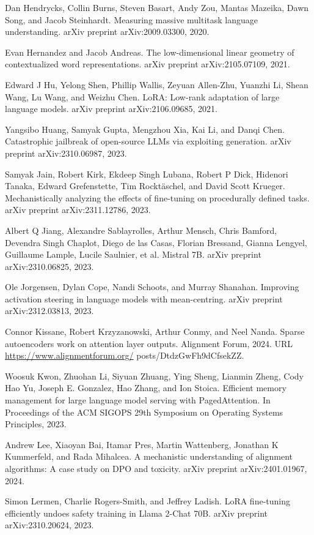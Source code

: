 \documentclass[10pt]{article}
\begin{document}
Dan Hendrycks, Collin Burns, Steven Basart, Andy Zou, Mantas Mazeika, Dawn Song, and Jacob Steinhardt. Measuring massive multitask language understanding. arXiv preprint arXiv:2009.03300, 2020.

Evan Hernandez and Jacob Andreas. The low-dimensional linear geometry of contextualized word representations. arXiv preprint arXiv:2105.07109, 2021.

Edward J Hu, Yelong Shen, Phillip Wallis, Zeyuan Allen-Zhu, Yuanzhi Li, Shean Wang, Lu Wang, and Weizhu Chen. LoRA: Low-rank adaptation of large language models. arXiv preprint arXiv:2106.09685, 2021.

Yangsibo Huang, Samyak Gupta, Mengzhou Xia, Kai Li, and Danqi Chen. Catastrophic jailbreak of open-source LLMs via exploiting generation. arXiv preprint arXiv:2310.06987, 2023.

Samyak Jain, Robert Kirk, Ekdeep Singh Lubana, Robert P Dick, Hidenori Tanaka, Edward Grefenstette, Tim Rocktäschel, and David Scott Krueger. Mechanistically analyzing the effects of fine-tuning on procedurally defined tasks. arXiv preprint arXiv:2311.12786, 2023.

Albert Q Jiang, Alexandre Sablayrolles, Arthur Mensch, Chris Bamford, Devendra Singh Chaplot, Diego de las Casas, Florian Bressand, Gianna Lengyel, Guillaume Lample, Lucile Saulnier, et al. Mistral 7B. arXiv preprint arXiv:2310.06825, 2023.

Ole Jorgensen, Dylan Cope, Nandi Schoots, and Murray Shanahan. Improving activation steering in language models with mean-centring. arXiv preprint arXiv:2312.03813, 2023.

Connor Kissane, Robert Krzyzanowski, Arthur Conmy, and Neel Nanda. Sparse autoencoders work on attention layer outputs. Alignment Forum, 2024. URL \href{https://www.alignmentforum.org/}{https://www.alignmentforum.org/} posts/DtdzGwFh9dCfsekZZ.

Woosuk Kwon, Zhuohan Li, Siyuan Zhuang, Ying Sheng, Lianmin Zheng, Cody Hao Yu, Joseph E. Gonzalez, Hao Zhang, and Ion Stoica. Efficient memory management for large language model serving with PagedAttention. In Proceedings of the ACM SIGOPS 29th Symposium on Operating Systems Principles, 2023.

Andrew Lee, Xiaoyan Bai, Itamar Pres, Martin Wattenberg, Jonathan K Kummerfeld, and Rada Mihalcea. A mechanistic understanding of alignment algorithms: A case study on DPO and toxicity. arXiv preprint arXiv:2401.01967, 2024.

Simon Lermen, Charlie Rogers-Smith, and Jeffrey Ladish. LoRA fine-tuning efficiently undoes safety training in Llama 2-Chat 70B. arXiv preprint arXiv:2310.20624, 2023.
\end{document}
